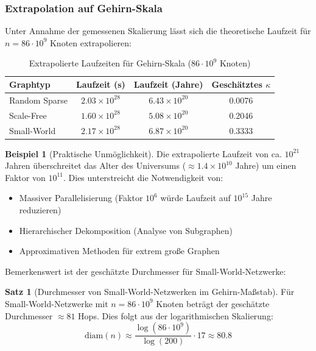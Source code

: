 ﻿\documentclass[a4paper,12pt]{article}
\theoremstyle{definition}
\newtheorem{beispiel}{Beispiel}
\newtheorem{satz}{Satz}
\begin{document}
	\subsubsection{Extrapolation auf Gehirn-Skala}
	
	Unter Annahme der gemessenen Skalierung lässt sich die theoretische Laufzeit für $n = 86 \cdot 10^9$ Knoten extrapolieren:
	
	\begin{table}[H]
		\centering
		\caption{Extrapolierte Laufzeiten für Gehirn-Skala ($86 \cdot 10^9$ Knoten)}
		\label{tab:brain_scale_extrapolation}
		\begin{tabular}{lccc}
			\hline
			\textbf{Graphtyp} & \textbf{Laufzeit (s)} & \textbf{Laufzeit (Jahre)} & \textbf{Geschätztes $\kappa$} \\
			\hline
			Random Sparse & $2.03 \times 10^{28}$ & $6.43 \times 10^{20}$ & 0.0076 \\
			Scale-Free & $1.60 \times 10^{28}$ & $5.08 \times 10^{20}$ & 0.2046 \\
			Small-World & $2.17 \times 10^{28}$ & $6.87 \times 10^{20}$ & 0.3333 \\
			\hline
		\end{tabular}
	\end{table}
	
	\begin{beispiel}[Praktische Unmöglichkeit]
		Die extrapolierte Laufzeit von ca. $10^{21}$ Jahren überschreitet das Alter des Universums ($\approx 1.4 \times 10^{10}$ Jahre) um einen Faktor von $10^{11}$. Dies unterstreicht die Notwendigkeit von:
		\begin{itemize}
			\item[-] Massiver Parallelisierung (Faktor $10^6$ würde Laufzeit auf $10^{15}$ Jahre reduzieren)
			\item[-] Hierarchischer Dekomposition (Analyse von Subgraphen)
			\item[-] Approximativen Methoden für extrem große Graphen
		\end{itemize}
	\end{beispiel}
	
	Bemerkenswert ist der geschätzte Durchmesser für Small-World-Netzwerke:
	
	\begin{satz}[Durchmesser von Small-World-Netzwerken im Gehirn-Maßstab]
		Für Small-World-Netzwerke mit $n = 86 \cdot 10^9$ Knoten beträgt der geschätzte Durchmesser $\approx 81$ Hops. Dies folgt aus der logarithmischen Skalierung:
		\[
		\text{diam}(n) \approx \frac{\log(86 \cdot 10^9)}{\log(200)} \cdot 17 \approx 80.8
		\]
	\end{satz}
	
\end{document}
